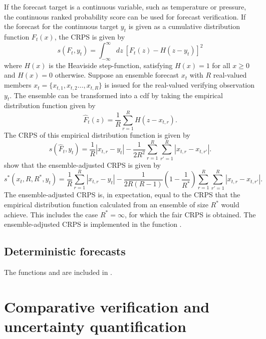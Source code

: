 \documentclass[article]{jss}
\begin{document}
If the forecast target is a continuous variable, such as temperature or pressure, the continuous ranked probability score \citep{matheson1976scoring} can be used for forecast verification.
If the forecast for the continuous target $y_t$ is given as a cumulative distribution function $F_t(x)$, the CRPS is given by 
%
\begin{equation}
s(F_t, y_t) = \int_{-\infty}^\infty dz\ \left[F_t(z) - H(z-y_t)\right]^2
\end{equation}
%
where $H(x)$ is the Heaviside step-function, satisfying $H(x)=1$ for all $x\ge 0$ and $H(x)=0$ otherwise.
Suppose an ensemble forecast $x_t$ with $R$ real-valued members $x_t = \{x_{t,1}, x_{t,2} \dots, x_{t,R}\}$ is issued for the real-valued verifying observation $y_t$.
The ensemble can be transformed into a cdf by taking the empirical distribution function given by 
%
\begin{equation}
\hat{F}_t(z) = \frac{1}{R} \sum_{r=1}^{R} H(z - x_{t,r}).
\end{equation}
%
The CRPS of this empirical distribution function is given by
%
\begin{equation}
s(\hat{F}_t, y_t) = \frac{1}{R}|x_{t,r}-y_t| - \frac{1}{2R^2} \sum_{r=1}^R \sum_{r'=1}^R |x_{t,r}-x_{t,r'}|.
\end{equation}
%
\citet{fricker2013three} show that the ensemble-adjusted CRPS is given by
%
\begin{equation}
s^*(x_t, R, R^*, y_t) = \frac{1}{R}\sum_{r=1}^R |x_{t,r} - y_t| - \frac{1}{2R(R-1)}\left(1-\frac{1}{R^*}\right) \sum_{r=1}^R\sum_{r'=1}^R |x_{t,r}-x_{t,r'}|.
\end{equation}
%
The ensemble-adjusted CRPS is, in expectation, equal to the CRPS that the empirical distribution function calculated from an ensemble of size $R^*$ would achieve.
This includes the case $R^*=\infty$, for which the fair CRPS is obtained.
The ensemble-adjusted CRPS is implemented in the  function .


\subsection{Deterministic forecasts}


The functions  and  are included in .


\section{Comparative verification and uncertainty quantification}
\end{document}
